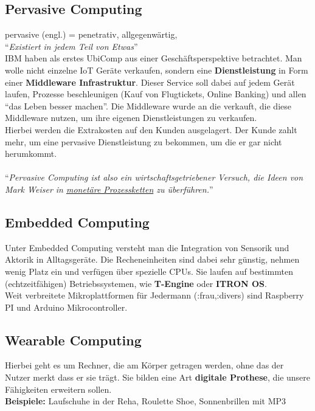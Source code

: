 \documentclass[a4paper]{article}
\begin{document}
\subsection{Pervasive Computing}
pervasive (engl.) = penetrativ, allgegenwärtig,\\
 ``\textit{Existiert in jedem Teil von Etwas}''\\
  
IBM haben als erstes UbiComp aus einer Geschäftsperspektive betrachtet. Man wolle nicht einzelne IoT Geräte verkaufen, sondern eine \textbf{Dienstleistung} in Form einer \textbf{Middleware Infrastruktur}. Dieser Service soll dabei auf jedem Gerät laufen, Prozesse beschleunigen (Kauf von Flugtickets, Online Banking) und allen ``das Leben besser machen''. Die Middleware wurde an die verkauft, die diese Middleware nutzen, um ihre eigenen Dienstleistungen zu verkaufen.\\

Hierbei werden die Extrakosten auf den Kunden ausgelagert. Der Kunde zahlt mehr, um eine pervasive Dienstleistung zu bekommen, um die er gar nicht herumkommt.\\
\\
``\textit{Pervasive Computing ist also ein wirtschaftsgetriebener Versuch, die Ideen von Mark Weiser in \underline{monetäre Prozessketten} zu überführen.}''

\subsection{Embedded Computing}
Unter Embedded Computing versteht man die Integration von Sensorik und Aktorik in Alltagsgeräte. Die Recheneinheiten sind dabei sehr günstig, nehmen wenig Platz ein und verfügen über spezielle CPUs. Sie laufen auf bestimmten (echtzeitfähigen) Betriebssystemen, wie \textbf{T-Engine} oder \textbf{ITRON OS}.\\

Weit verbreitete Mikroplattformen für Jedermann (:frau,:divers) sind Raspberry PI und Arduino Mikrocontroller.

\subsection{Wearable Computing}
Hierbei geht es um Rechner, die am Körper getragen werden, ohne das der Nutzer merkt dass er sie trägt. Sie bilden eine Art \textbf{digitale Prothese}, die unsere Fähigkeiten erweitern sollen.\\
\textbf{Beispiele:} Laufschuhe in der Reha, Roulette Shoe, Sonnenbrillen mit MP3
\end{document}
